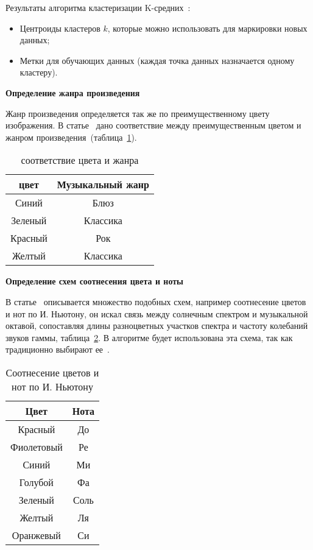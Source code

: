 Результаты алгоритма кластеризации K-средних~\cite{academic_performance}:

\begin{itemize}
	\item Центроиды кластеров \(k\), которые можно использовать для маркировки новых данных;
	\item Метки для обучающих данных (каждая точка данных назначается одному кластеру).
\end{itemize}



\textbf{Определение жанра произведения}

Жанр произведения определяется так же по преимущественному цвету изображения. 
В статье~\cite{automatic_sound_generation} дано соответствие между преимущественным цветом и жанром произведения~(таблица~\ref{tab:rejected_colors}).

\begin{table}[h]
	\centering
	\caption{соответствие цвета и жанра}
	\label{tab:rejected_colors}

	\begin{tabular}{|c|c|}
		\hline
		\textbf{цвет} & \textbf{Музыкальный жанр} \\
		\hline
		Синий & Блюз \\
		\hline
		Зеленый & Классика \\
		\hline
		Красный & Рок \\
		\hline
		Желтый & Классика \\
		\hline
	\end{tabular}
\end{table}

\textbf{Определение схем соотнесения цвета и ноты}  

В статье~\cite{colortonote} описывается множество подобных схем, например соотнесение цветов и нот по И. Ньютону, он искал связь между солнечным спектром и музыкальной октавой, сопоставляя длины разноцветных участков спектра и частоту колебаний звуков гаммы, таблица~\ref{tab:Newton}. В алгоритме будет использована эта схема, так как традиционно выбирают ее~\cite{alg, actuality, web, big}. 
	
	\begin{table}[ht]
		\centering
		\caption{Соотнесение цветов и нот по И. Ньютону}
		\label{tab:Newton}

		\begin{tabular}{|c|c|}
			\hline
			\textbf{Цвет} & \textbf{Нота} \\ 
			\hline
			Красный & До \\
			\hline
			Фиолетовый & Ре \\
			\hline
			Синий & Ми \\
			\hline
			Голубой & Фа \\
			\hline
			Зеленый & Соль \\
			\hline
			Желтый & Ля \\
			\hline
			Оранжевый & Си \\
			\hline
		\end{tabular}
	\end{table}

